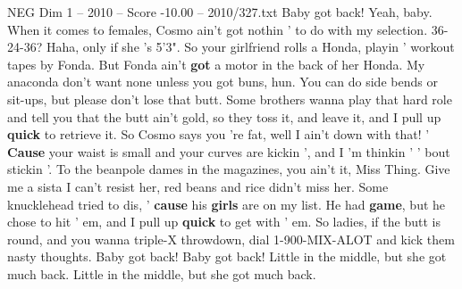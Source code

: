 \begin{textsample}{NEG Dim 1 – 2010 – Score -10.00 – 2010/327.txt}
Baby got back!
Yeah, baby.
When it comes to females, Cosmo ain't got nothin ' to do with my selection. 36-24-36?
Haha, only if she 's 5'3".
So your girlfriend rolls a Honda, playin ' workout tapes by Fonda.
But Fonda ain't \textbf{got} a motor in the back of her Honda.
My anaconda don't want none unless you got buns, hun.
You can do side bends or sit-ups, but please don't lose that butt.
Some brothers wanna play that hard role and tell you that the butt ain't gold, so they toss it, and leave it, and I pull up \textbf{quick} to retrieve it.
So Cosmo says you 're fat, well I ain't down with that! ' \textbf{Cause} your waist is small and your curves are kickin ', and I 'm thinkin ' ' bout stickin '.
To the beanpole dames in the magazines, you ain't it, Miss Thing.
Give me a sista I can't resist her, red beans and rice didn't miss her.
Some knucklehead tried to dis, ' \textbf{cause} his \textbf{girls} are on my list.
He had \textbf{game}, but he chose to hit ' em, and I pull up \textbf{quick} to get with ' em.
So ladies, if the butt is round, and you wanna triple-X throwdown, dial 1-900-MIX-ALOT and kick them nasty thoughts.
Baby got back!
Baby got back!
Little in the middle, but she got much back.
Little in the middle, but she got much back.

\end{textsample}
